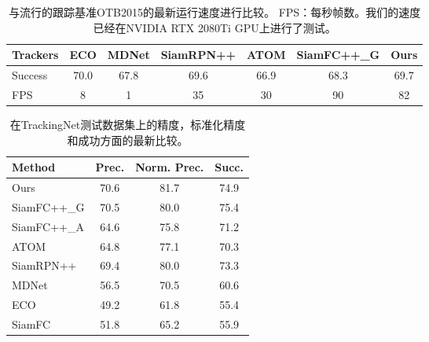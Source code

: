 \begin{table}[t]
\renewcommand\arraystretch{0.8}
\caption{与流行的跟踪基准OTB2015的最新运行速度进行比较。 FPS：每秒帧数。我们的速度已经在NVIDIA RTX 2080Ti GPU上进行了测试。}
\setlength{\tabcolsep}{3pt}
\begin{center}
\begin{tabular}{l | c c c c c c}
\toprule
Trackers & ECO & MDNet & SiamRPN++ & ATOM & SiamFC++\_G & Ours \\
\midrule
Success & 70.0 & 67.8  & 69.6      & 66.9      & 68.3       & 69.7 \\
FPS     & 8    & 1     & 35        & 30       & 90         & 82  \\
\bottomrule
\end{tabular}
\end{center}
\label{table:otb}
\end{table}

\begin{table}[t]
\renewcommand\arraystretch{0.8}
\centering
\caption{在TrackingNet测试数据集上的精度，标准化精度和成功方面的最新比较。}
\begin{tabular}{l c c c}
\toprule
Method   &  Prec.   &  Norm. Prec. & Succ.  \\
\midrule
Ours  &  70.6&  81.7 &74.9 \\
SiamFC++\_G& 70.5 & 80.0 & 75.4 \\
SiamFC++\_A  & 64.6 & 75.8 & 71.2 \\
ATOM              & 64.8 & 77.1 & 70.3 \\
SiamRPN++&  69.4 & 80.0 &73.3 \\
MDNet	 &  56.5&  70.5 &60.6 \\
ECO	 &  49.2&  61.8 &55.4 \\
SiamFC	 &  51.8&  65.2 &55.9 \\
\bottomrule
\end{tabular}
\label{tabel:trackingnet}
\end{table}

